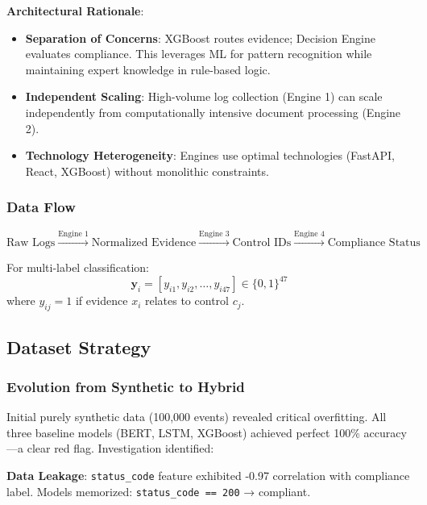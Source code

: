 \documentclass[11pt,conference]{IEEEtran}
\begin{document}
\textbf{Architectural Rationale}:
\begin{itemize}
    \item \textbf{Separation of Concerns}: XGBoost routes evidence; Decision Engine evaluates compliance. This leverages ML for pattern recognition while maintaining expert knowledge in rule-based logic.
    \item \textbf{Independent Scaling}: High-volume log collection (Engine 1) can scale independently from computationally intensive document processing (Engine 2).
    \item \textbf{Technology Heterogeneity}: Engines use optimal technologies (FastAPI, React, XGBoost) without monolithic constraints.
\end{itemize}

\subsubsection{Data Flow}

\begin{equation}
\text{Raw Logs} \xrightarrow{\text{Engine 1}} \text{Normalized Evidence} \xrightarrow{\text{Engine 3}} \text{Control IDs} \xrightarrow{\text{Engine 4}} \text{Compliance Status}
\end{equation}

For multi-label classification:
\begin{equation}
\mathbf{y}_i = [y_{i1}, y_{i2}, \ldots, y_{i47}] \in \{0,1\}^{47}
\end{equation}
where $y_{ij} = 1$ if evidence $x_i$ relates to control $c_j$.

\subsection{Dataset Strategy}

\subsubsection{Evolution from Synthetic to Hybrid}

Initial purely synthetic data (100,000 events) revealed critical overfitting. All three baseline models (BERT, LSTM, XGBoost) achieved perfect 100\% accuracy—a clear red flag. Investigation identified:

\textbf{Data Leakage}: \texttt{status\_code} feature exhibited -0.97 correlation with compliance label. Models memorized: \texttt{status\_code == 200} → compliant.
\end{document}
